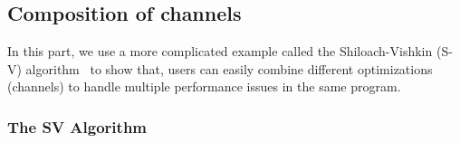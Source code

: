 \documentclass{sokendai_thesis} %
\begin{document}

\subsection{Composition of channels}
\label{sec:sv-algo}


In this part, we use a more complicated example called the Shiloach-Vishkin (S-V) algorithm~\cite{ShVi82} to show that,
users can easily combine different optimizations (channels) to handle multiple performance issues in the same program.

\subsubsection{The SV Algorithm}

\end{document}
